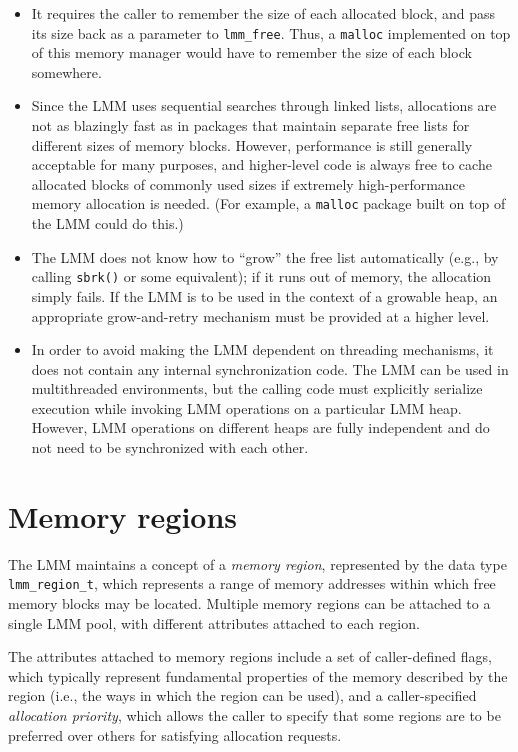 \begin{itemize}
\item	It requires the caller to remember the size of each allocated block,
	and pass its size back as a parameter to {\tt lmm_free}.
	Thus, a {\tt malloc} implemented on top of this memory manager
	would have to remember the size of each block somewhere.

\item	Since the LMM uses sequential searches through linked lists,
	allocations are not as blazingly fast
	as in packages that maintain separate free lists
	for different sizes of memory blocks.
	However, performance is still generally acceptable for many purposes,
	and higher-level code is always free
	to cache allocated blocks of commonly used sizes
	if extremely high-performance memory allocation is needed.
	(For example,
	a {\tt malloc} package built on top of the LMM could do this.)

\item	The LMM does not know how to ``grow'' the free list automatically
	(e.g., by calling {\tt sbrk()} or some equivalent);
	if it runs out of memory, the allocation simply fails.
	If the LMM is to be used in the context of a growable heap,
	an appropriate grow-and-retry mechanism must be provided
	at a higher level.

\item	In order to avoid making the LMM dependent on threading mechanisms,
	it does not contain any internal synchronization code.
	The LMM can be used in multithreaded environments,
	but the calling code must explicitly serialize execution
	while invoking LMM operations on a particular LMM heap.
	However, LMM operations on different heaps are fully independent
	and do not need to be synchronized with each other.
\end{itemize}

\section{Memory regions}
\label{lmm-regions}

The LMM maintains a concept of a \emph{memory region},
represented by the data type {\tt lmm_region_t},
which represents a range of memory addresses
within which free memory blocks may be located.
Multiple memory regions can be attached to a single LMM pool,
with different attributes attached to each region.

The attributes attached to memory regions
include a set of caller-defined flags,
which typically represent fundamental properties
of the memory described by the region
(i.e., the ways in which the region can be used),
and a caller-specified \emph{allocation priority},
which allows the caller to specify that some regions
are to be preferred over others for satisfying allocation requests.

